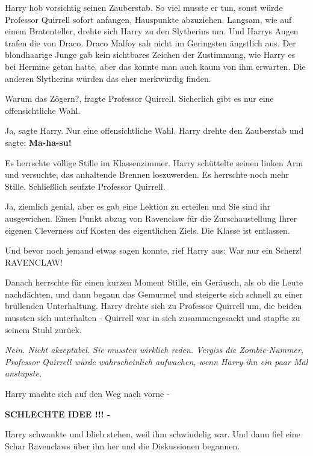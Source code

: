 Harry hob vorsichtig seinen Zauberstab. So viel musste er tun, sonst würde
Professor Quirrell sofort anfangen, Hauspunkte abzuziehen. Langsam, wie auf
einem Bratenteller, drehte sich Harry zu den Slytherins um. Und Harrys Augen
trafen die von Draco. Draco Malfoy sah nicht im Geringsten ängstlich aus. Der
blondhaarige Junge gab kein sichtbares Zeichen der Zustimmung, wie Harry es bei
Hermine getan hatte, aber das konnte man auch kaum von ihm erwarten. Die anderen
Slytherins würden das eher merkwürdig finden.

\glqq Warum das Zögern?\grqq{}, fragte Professor Quirrell. \glqq Sicherlich gibt
es nur eine offensichtliche Wahl.\grqq{}

\glqq Ja\grqq{}, sagte Harry. \glqq Nur eine offensichtliche Wahl.\grqq{} Harry
drehte den Zauberstab und sagte: \textbf{\glqq Ma-ha-su!\grqq{}}

Es herrschte völlige Stille im Klassenzimmer. Harry schüttelte seinen linken Arm
und versuchte, das anhaltende Brennen loszuwerden. Es herrschte noch mehr
Stille. Schließlich seufzte Professor Quirrell.

\glqq Ja, ziemlich genial, aber es gab eine Lektion zu erteilen und Sie sind ihr
ausgewichen. Einen Punkt abzug von Ravenclaw für die Zurschaustellung Ihrer
eigenen Cleverness auf Kosten des eigentlichen Ziels. Die Klasse ist
entlassen.\grqq{}

Und bevor noch jemand etwas sagen konnte, rief Harry aus: \glqq War nur ein
Scherz! RAVENCLAW!\grqq{}

Danach herrschte für einen kurzen Moment Stille, ein Geräusch, als ob die Leute
nachdächten, und dann begann das Gemurmel und steigerte sich schnell zu einer
brüllenden Unterhaltung. Harry drehte sich zu Professor Quirrell um, die beiden
mussten sich unterhalten - Quirrell war in sich zusammengesackt und stapfte zu
seinem Stuhl zurück.

\emph{Nein. Nicht akzeptabel. Sie mussten wirklich reden. Vergiss die
Zombie-Nummer, Professor Quirrell würde wahrscheinlich aufwachen, wenn Harry ihn
ein paar Mal anstupste.}

Harry machte sich auf den Weg nach vorne -

\textbf{SCHLECHTE IDEE !!! -}

Harry schwankte und blieb stehen, weil ihm schwindelig war. Und dann fiel eine
Schar Ravenclaws über ihn her und die Diskussionen begannen.